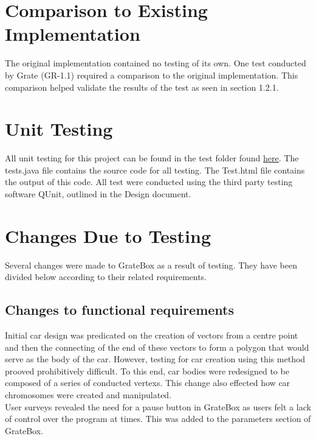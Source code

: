 \documentclass[12pt, titlepage]{article}
\begin{document}
\section{Comparison to Existing Implementation}

The original implementation contained no testing of its own. One test conducted by Grate (GR-1.1) required a comparison to the original implementation. This comparison helped validate the results of the test as seen in section 1.2.1.

\section{Unit Testing}

All unit testing for this project can be found in the test folder found \href{https://gitlab.cas.mcmaster.ca/linkk4/GrateBox/tree/master/src/test}{here}. The tests.java file contains the source code for all testing. The Test.html file contains the output of this code. All test were conducted using the third party testing software QUnit, outlined in the Design document.

\section{Changes Due to Testing}

Several changes were made to GrateBox as a result of testing. They have been divided below according to their related requirements.

\subsection{Changes to functional requirements}

Initial car design was predicated on the creation of vectors from a centre point and then the connecting of the end of these vectors to form a polygon that would serve as the body of the car. However, testing for car creation using this method prooved prohibitively difficult. To this end, car bodies were redesigned to be composed of a series of conducted vertexs. This change also effected how car chromosomes were created and manipulated.\\


User surveys revealed the need for a pause button in GrateBox as users felt a lack of control over the program at times. This was added to the parameters section of GrateBox.\\
\end{document}

